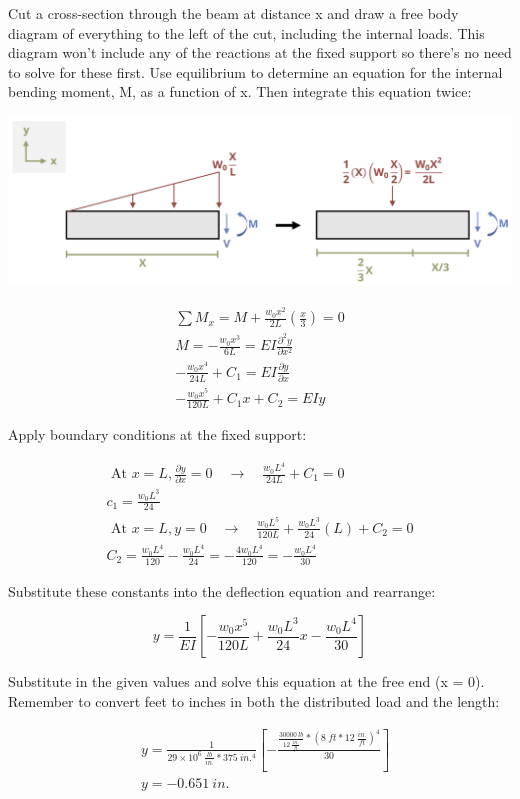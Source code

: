 \documentclass[
  letterpaper,
  DIV=11,
  numbers=noendperiod]{scrreprt}
\begin{document}
\begin{tcolorbox}
\begin{tcolorbox}
Cut a cross-section through the beam at distance x and draw a free body
diagram of everything to the left of the cut, including the internal
loads. This diagram won't include any of the reactions at the fixed
support so there's no need to solve for these first. Use equilibrium to
determine an equation for the internal bending moment, M, as a function
of x. Then integrate this equation twice:

\begin{center}
\includegraphics{images/CH11 PNGs/example11.2-2.png}
\end{center}

\[
\begin{gathered} \sum M_x=M+\frac{w_0 x^2}{2 L}\left(\frac{x}{3}\right)=0 \\ M=-\frac{w_0 x^3}{6 L}=E I \frac{\partial^2 y}{\partial x^2} \\ -\frac{w_0 x^4}{24 L}+C_1=E I \frac{\partial y}{\partial x} \\ -\frac{w_0 x^5}{120 L}+C_1 x+C_2=EIy\end{gathered}
\]

Apply boundary conditions at the fixed support:

\[
\begin{gathered} \text { At } x=L, \frac{\partial y}{\partial x}=0 \quad \rightarrow \quad \frac{w_0 L^4}{24 L}+C_1=0
\\ c_1=\frac{w_0 L^3}{24}
\\ \text { At } x=L, y=0 \quad \rightarrow \quad \frac{w_0 L^5}{120 L}+\frac{w_0 L^3}{24}(L)+C_2=0
\\ C_2=\frac{w_0 L^4}{120}-\frac{w_0 L^4}{24}=-\frac{4 w_0 L^4}{120}=-\frac{w_0 L^4}{30} \end{gathered}
\]

Substitute these constants into the deflection equation and rearrange:

\[
y=\frac{1}{E I}\left[-\frac{w_0 x^5}{120L}+\frac{w_0 L^3}{24} x-\frac{w_0 L^4}{30}\right]
\]

Substitute in the given values and solve this equation at the free end
(x = 0). Remember to convert feet to inches in both the distributed load
and the length:

\[
\begin{aligned} & y=\frac{1}{29 \times 10^6~\frac{lb}{in.}*375{~in.^4}} \left[-\frac{\frac{30000{~lb}}{12~\frac{in.}{ft}}*(8{~ft}*12~\frac{in.}{ft})^4}{30}\right] \\ & y=- 0.651{~in.}\end{aligned}
\]

\end{tcolorbox}

\end{tcolorbox}
\end{document}
